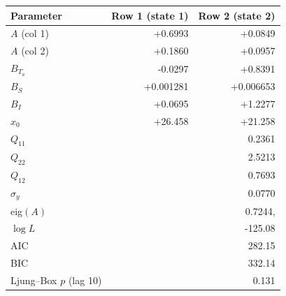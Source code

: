 \begin{tabular}{l r r}
\toprule
Parameter & Row 1 (state 1) & Row 2 (state 2) \\
\midrule
$A$ (col 1) & +0.6993 & +0.0849 \\
$A$ (col 2) & +0.1860 & +0.0957 \\
$B_{T_a}$ & -0.0297 & +0.8391 \\
$B_{S}$ & +0.001281 & +0.006653 \\
$B_{I}$ & +0.0695 & +1.2277 \\
$x_0$ & +26.458 & +21.258 \\
\midrule
$Q_{11}$ & \multicolumn{2}{r}{0.2361} \\
$Q_{22}$ & \multicolumn{2}{r}{2.5213} \\
$Q_{12}$ & \multicolumn{2}{r}{0.7693} \\
$\sigma_y$ & \multicolumn{2}{r}{0.0770} \\
eig$(A)$ & \multicolumn{2}{r}{0.7244,\; 0.0706} \\
$\log L$ & \multicolumn{2}{r}{-125.08} \\
AIC & \multicolumn{2}{r}{282.15} \\
BIC & \multicolumn{2}{r}{332.14} \\
Ljung--Box $p$ (lag 10) & \multicolumn{2}{r}{0.131} \\
\bottomrule
\end{tabular}